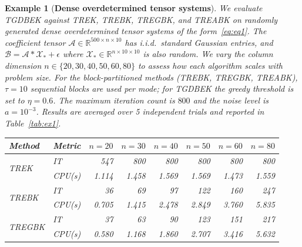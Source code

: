 \documentclass[11pt]{article}
\newtheorem{example}[theorem]{Example}
\def\fm#1{\mathcal{#1}}
\begin{document}
\begin{example}[\textbf{Dense overdetermined tensor systems}] \label{ex:dense}
We evaluate TGDBEK against TREK, TREBK, TREGBK, and TREABK on randomly generated dense overdetermined tensor systems of the form~\eqref{eq:eq1}. The coefficient tensor $\fm A \in \mathbb{R}^{500\times n\times 10}$ has i.i.d.\ standard Gaussian entries, and $\fm B = \fm A * \fm X_\ast + \fm\epsilon$ where $\fm X_\ast \in \mathbb{R}^{n\times 10\times 10}$ is also random. We vary the column dimension $n\in\{20,30,40,50,60,80\}$ to assess how each algorithm scales with problem size. For the block-partitioned methods (TREBK, TREGBK, TREABK), $\tau=10$ sequential blocks are used per mode; for TGDBEK the greedy threshold is set to $\eta=0.6$. The maximum iteration count is $800$ and the noise level is $a=10^{-3}$. Results are averaged over 5 independent trials and reported in Table~\ref{tab:ex1}.
%
%
\begin{table}[htbp]
\centering
\small
\setlength{\tabcolsep}{4pt}
\begin{tabular}{llrrrrrr}
\toprule
Method & Metric & $n=20$ & $n=30$ & $n=40$ & $n=50$ & $n=60$ & $n=80$ \\
\midrule
\multirow{2}{*}{TREK}
  & IT     & 547   & 800   & 800   & 800   & 800   & 800   \\
  & CPU(s) & 1.114 & 1.458 & 1.569 & 1.569 & 1.473 & 1.559 \\
\midrule
\multirow{2}{*}{TREBK}
  & IT     & 36    & 69    & 97    & 122   & 160   & 247   \\
  & CPU(s) & 0.705 & 1.415 & 2.478 & 2.849 & 3.760 & 5.835 \\
\midrule
\multirow{2}{*}{TREGBK}
  & IT     & 37    & 63    & 90    & 123   & 151   & 217   \\
  & CPU(s) & 0.580 & 1.168 & 1.860 & 2.707 & 3.416 & 5.632 \\

\end{tabular}
\end{table}
\end{example}
\end{document}
